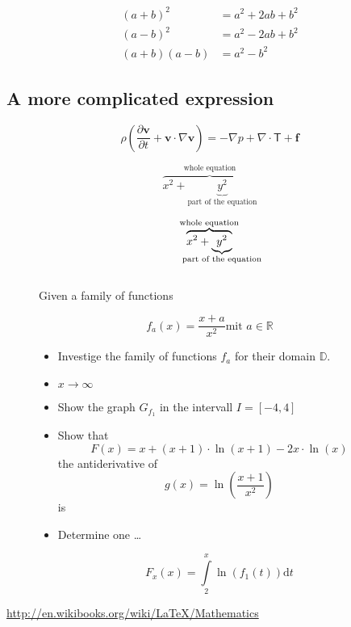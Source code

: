 \documentclass[10pt, a4paper]{article}
\numberwithin{equation}{section}
\numberwithin{figure}{section}
\begin{document}
\begin{align}
  (a+b)^2    &=    a^2+2ab+b^2 \nonumber \\
  (a-b)^2    &=    a^2-2ab+b^2 \nonumber \\
  (a+b)(a-b) &=    a^2-b^2
\end{align}

\subsection{A more complicated expression}
\[ \rho\left( \frac{\partial \mathbf{v}}{\partial t} + \mathbf{v}\cdot\nabla\mathbf{v}\right) = -\nabla p + \nabla\cdot\mathsf{T}+\mathbf{f} \]

\[ \overbrace{x^2 + \underbrace{y^2}_\text{part of the equation}}^\text{whole equation} \]

\[ \overbrace{x^2 + \underbrace{y^2}_{\mathclap{\text{part of the equation}}}}^{{\text{whole equation}}} \]

\begin{equation}
[]
\end{equation}

\begin{figure}[h!]
Given a family of functions

\[ f_a(x) = \frac{x+a}{x^2} \text{mit } a \in \mathbb{R} \]

\begin{itemize}
\item Investige the family of functions \( f_a \) for their domain \( \mathbb{D} \).
\item \( x \to \infty \)
\item Show the graph \( G_{f_1} \) in the intervall \( I = [-4,4] \)
\item Show that 
\[ F(x) = x+ (x+1)\cdot\ln(x+1)-2x\cdot\ln(x) \]
the antiderivative of \[ g(x) = \ln\left(\dfrac{x+1}{x^2}\right) \] is
\item Determine one \ldots

\[ F_x(x) = \int\limits_2^x\ln\left(f_1(t)\right)\mathrm{d}t \]

\end{itemize}
\end{figure}

\url{http://en.wikibooks.org/wiki/LaTeX/Mathematics}
\end{document}

